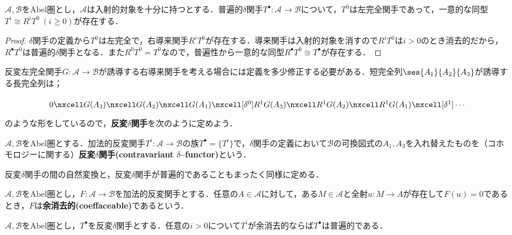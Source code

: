 \begin{cor}\label{cor:導来関手と一致するための条件}
	$\mathscr{A},\mathscr{B}$をAbel圏とし，$\mathscr{A}$は入射的対象を十分に持つとする．普遍的$\delta$関手$T^\bullet:\mathscr{A}\to\mathscr{B}$について，$T^0$は左完全関手であって，一意的な同型$T^i\cong R^iT^0~(i\geq 0)$が存在する．
\end{cor}

\begin{proof}
	$\delta$関手の定義から$T^0$は左完全で，右導来関手$R^iT^0$が存在する．導来関手は入射的対象を消すので$R^iT^0$は$i>0$のとき消去的だから，$R^\bullet T^0$は普遍的$\delta$関手となる．また$R^0T^0=T^0$なので，普遍性から一意的な同型$R^\bullet T^0\cong T^\bullet$が存在する．
\end{proof}

反変左完全関手$G:\mathscr{A}\to\mathscr{B}$が誘導する右導来関手を考える場合には定義を多少修正する必要がある．短完全列$\ses{A_1}{A_2}{A_3}$が誘導する長完全列は；

\[\begin{tikzcd}
	0\nxcell G(A_3)\nxcell G(A_2)\nxcell G(A_1)\nxcell[\delta^0]R^1G(A_3)\nxcell R^1G(A_2)\nxcell R^1G(A_1)
	\nxcell[\delta^1]\cdots
\end{tikzcd}\]
のような形をしているので，\textbf{反変$\delta$関手}を次のように定めよう．

\begin{defi}[反変$\delta$関手]
	$\mathscr{A},\mathscr{B}$をAbel圏とする．加法的反変関手$T^i:\mathscr{A}\to\mathscr{B}$の族$T^\bullet=\{T^i\}$で，$\delta$関手の定義において$\mathscr{B}$の可換図式の$A_1,A_3$を入れ替えたものを（コホモロジーに関する）\textbf{反変$\delta$関手(contravariant $\delta$--functor)}という．
\end{defi}

反変$\delta$関手の間の自然変換と，反変$\delta$関手が普遍的であることもまったく同様に定める．
\begin{defi}[余消去的]
	$\mathscr{A},\mathscr{B}$をAbel圏とし，$F:\mathscr{A}\to\mathscr{B}$を加法的反変関手とする．任意の$A\in\mathscr{A}$に対して，ある$M\in\mathscr{A}$と全射$u:M\to A$が存在して$F(u)=0$であるとき，$F$は\textbf{余消去的(coeffaceable)}であるという．
\end{defi}

\begin{thm}
	$\mathscr{A},\mathscr{B}$をAbel圏とし，$T^\bullet$を反変$\delta$関手とする．任意の$i>0$について$T^i$が余消去的ならば$T^\bullet$は普遍的である．
\end{thm}

